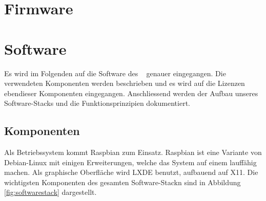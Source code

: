 {\begin{a3pages}
{\begin{minipage}{115mm}
    \vspace*{40mm}

    \hfill{}
\end{minipage}}
\hspace*{15mm}
\end{a3pages}}


\section{Firmware \Sensor}
\label{sec:firmware:sensor}



\clearpage
\section{Software \Master}
\label{sec:software:master}

Es wird  im Folgenden auf  die Software des \Master~  genauer eingegangen. Die
verwendeten  Komponenten  werden beschrieben  und  es  wird auf  die  Lizenzen
ebendieser  Komponenten eingegangen. Anschliessend  werden der  Aufbau unseres
Software-Stacks und die Funktionsprinzipien dokumentiert.


\subsection{Komponenten}
\label{subsec:software:master:components}

Als Betriebssystem kommt Raspbian zum  Einsatz. Raspbian ist eine Variante von
Debian-Linux mit  einigen Erweiterungen,  welche das  System auf  einem \Raspi
lauff\"ahig machen. Als  graphische Oberfl\"ache wird LXDE  benutzt, aufbauend
auf  X11. Die wichtigsten  Komponenten  des gesamten  Software-Stackn sind  in
Abbildung \ref{fig:softwarestack} dargestellt.

